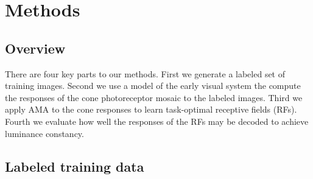 \documentclass{jov}
\begin{document}
\section*{Methods} \label{Methods}
\subsection{Overview}
There are four key parts to our methods.  First we generate a labeled set of training images.  Second we use a model of the early visual system the compute the responses of the cone photoreceptor mosaic to the labeled images. Third we apply AMA to the cone responses to learn task-optimal receptive fields (RFs). Fourth we evaluate how well the responses of the RFs may be decoded to achieve luminance constancy.

\subsection{Labeled training data} \label{method:VirtualWorld}
\end{document}

